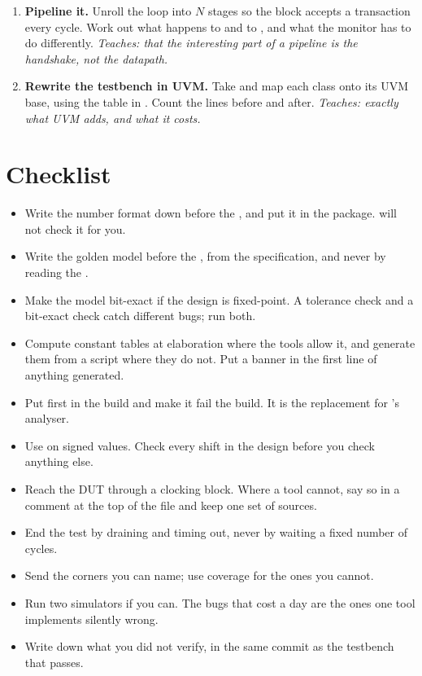 \begin{enumerate}
  \item \textbf{Pipeline it.} Unroll the loop into $N$ stages so the block
        accepts a transaction every cycle. Work out what happens to
         and to , and what the monitor
        has to do differently.
        \emph{Teaches: that the interesting part of a pipeline is the
        handshake, not the datapath.}

  \item \textbf{Rewrite the testbench in UVM.} Take
         and map each class onto its UVM base, using
        the table in . Count the lines before and after.
        \emph{Teaches: exactly what UVM adds, and what it costs.}
\end{enumerate}

\section{Checklist}
\label{sec:case:checklist}

\begin{itemize}
  \item Write the number format down before the \RTL{}, and put it in the
        package. \SV{} will not check it for you.
  \item Write the golden model before the \RTL{}, from the specification, and
        never by reading the \RTL{}.
  \item Make the model bit-exact if the design is fixed-point. A tolerance
        check and a bit-exact check catch different bugs; run both.
  \item Compute constant tables at elaboration where the tools allow it, and
        generate them from a script where they do not. Put a
         banner in the first line of anything generated.
  \item Put  first in the build and make it fail the build.
        It is the replacement for \VHDL{}'s analyser.
  \item Use \code{>>>} on signed values. Check every shift in the design
        before you check anything else.
  \item Reach the DUT through a clocking block. Where a tool cannot, say so
        in a comment at the top of the file and keep one set of sources.
  \item End the test by draining and timing out, never by waiting a fixed
        number of cycles.
  \item Send the corners you can name; use coverage for the ones you cannot.
  \item Run two simulators if you can. The bugs that cost a day are the ones
        one tool implements silently wrong.
  \item Write down what you did not verify, in the same commit as the
        testbench that passes.
\end{itemize}
